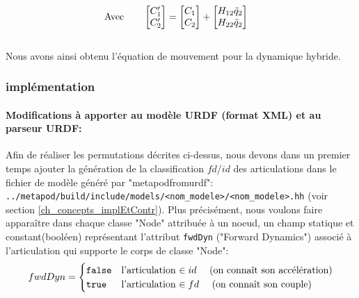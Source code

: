 \documentclass{report}
\begin{document}
\begin{align}
&\textnormal{Avec} \qquad
\begin{bmatrix}
  C'_{1} \\
  C'_{2}
\end{bmatrix}
=
\begin{bmatrix}
  C_{1} \\
  C_{2}
\end{bmatrix}
+
\begin{bmatrix}
  H_{12} \ddot{q}_2 \\
  H_{22} \ddot{q}_2
\end{bmatrix}
\end{align}
\\
Nous avons ainsi obtenu l'équation de mouvement pour la dynamique hybride.

\subsubsection{implémentation}

\paragraph{Modifications à apporter au modèle URDF (format XML) et au parseur URDF:}

Afin de réaliser les permutations décrites ci-dessus, nous devons dans un premier temps ajouter la génération de la classification $fd$/$id$ des articulations dans le fichier de modèle généré par "metapodfromurdf": \verb;../metapod/build/include/models/<nom_modele>/<nom_modele>.hh; (voir section \ref{ch_concepts_implEtContr}). Plus précisément, nous voulons faire apparaître dans chaque classe "Node" attribuée à un noeud, un champ statique et constant\footnotemark[1] (booléen) représentant l'attribut \verb;fwdDyn; ("Forward Dynamics") associé à l'articulation qui supporte le corps de classe "Node":
\begin{equation*}
fwdDyn = 
\begin{cases}
  \verb;false; & \textnormal{l'articulation $\in id \quad$ (on connaît son accélération)} \\
  \verb;true; & \textnormal{l'articulation $\in fd \quad$ (on connaît son couple)}
\end{cases}
\end{equation*}

\end{document}
